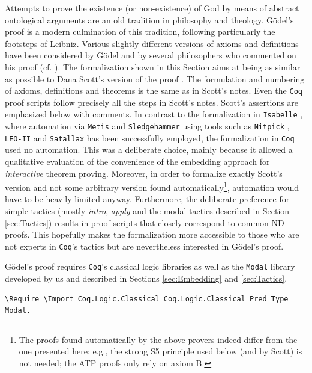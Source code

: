 \documentclass{llncs}
\newcommand{\blue}[1]{\textcolor[rgb]{0,0,1}{#1}}
\newcommand{\Require}{\blue{Require}}
\newcommand{\Import}{\blue{Import}}
\newcommand{\Coq}{\texttt{Coq}\xspace}
\newcommand{\Isabelle}{\texttt{Isabelle}\xspace}
\begin{document}
Attempts to prove the existence (or non-existence) of God by means of
abstract ontological arguments are an old tradition in philosophy and
theology. G\"{o}del's proof \cite{Goedel1970,GoedelNotes} is a modern
culmination of this tradition, following particularly the footsteps of
Leibniz. Various slightly different versions of axioms and definitions
have been considered by G\"{o}del and by several philosophers who
commented on his proof (cf.
\cite{sobel2004logic,AndersonGettings,Fitting,Adams,ContemporaryBibliography}).
The formalization shown in this Section aims at being as similar as
possible to Dana Scott's version of the proof \cite{ScottNotes}. The
formulation and numbering of axioms, definitions and theorems is the
same as in Scott's notes. Even the \Coq proof scripts follow precisely
all the steps in Scott's notes. Scott's assertions are emphasized
below with comments. In contrast to the formalization in \Isabelle
\cite{AFP}, where automation via \texttt{Metis}
\cite{Hurd03first-orderproof} and \texttt{Sledgehammer}
\cite{Sledgehammer} using tools such as \texttt{Nitpick}
\cite{Nitpick}, \texttt{LEO-II} \cite{LEO-II} and \texttt{Satallax}
\cite{Satallax} has been successfully employed, the formalization in
\Coq used no automation. This was a deliberate choice, mainly because
it allowed a qualitative evaluation of the convenience of the
embedding approach for \emph{interactive} theorem proving. Moreover,
in order to formalize exactly Scott's version and not some arbitrary
version found automatically\footnote{The proofs found automatically
  by the above provers indeed differ from the one presented here:
  e.g., the strong S5 principle used below (and by Scott) is not needed; the
  ATP proofs only rely on axiom B.}, automation would have to be
heavily limited anyway. Furthermore, the deliberate preference for
simple tactics (mostly \emph{intro}, \emph{apply} and the modal
tactics described in Section \ref{sec:Tactics}) results in proof
scripts that closely correspond to common ND
proofs. This hopefully makes the formalization more accessible to
those who are not experts in \Coq's tactics but are nevertheless
interested in G\"odel's proof.

G\"odel's proof requires \Coq's classical logic libraries as well as the
\texttt{Modal} library developed by us and described in Sections
\ref{sec:Embedding} and \ref{sec:Tactics}.

\begin{Verbatim}[commandchars=\\\{\},fontsize=\verbsize]
\Require \Import Coq.Logic.Classical Coq.Logic.Classical_Pred_Type Modal.
\end{Verbatim}
\end{document}
